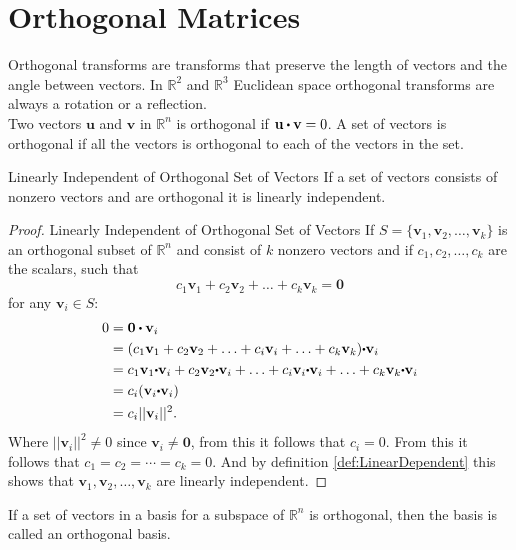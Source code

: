 
\section{Orthogonal Matrices}
Orthogonal transforms are transforms that preserve the length of vectors and the angle between vectors. In $\mathbb{R}^2$ and $\mathbb{R}^3$ Euclidean space orthogonal transforms are always a rotation or a reflection. \\
Two vectors $\textbf{u}$ and $\textbf{v}$ in $\mathbb{R}^n$ is orthogonal if $\textbf{u}\vprik \textbf{v}=0$. A set of vectors is orthogonal if all the vectors is orthogonal to each of the vectors in the set. 
\begin{theorem}{Linearly Independent of Orthogonal Set of Vectors}
If a set of vectors consists of nonzero vectors and are orthogonal it is linearly independent.\cite[375]{LiAl}
\end{theorem}

\begin{proof}{Linearly Independent of Orthogonal Set of Vectors}
If $S=\{\mathbf{v}_1, \mathbf{v}_2, \hdots, \mathbf{v}_k\}$ is an orthogonal subset of $\mathbb{R}^n$ and consist of $k$ nonzero vectors and if $c_1, c_2, \hdots, c_k$ are the scalars, such that
$$c_1\mathbf{v}_1 + c_2\mathbf{v}_2 + \hdots + c_k\mathbf{v}_k = \textbf{0}$$
for any $\mathbf{v}_i\in S$:
\begin{align*}
  0 &= \mathbf{0 \vprik v}_i  \\
  &= (c_1\mathbf{v}_1 + c_2\mathbf{v}_2 + \hdots + c_i \mathbf{v}_i + \hdots + c_k \mathbf{v}_k ) \mathbf{\vprik v}_i \\
  &= c_1\mathbf{v}_1 \mathbf{\vprik v}_i + c_2\mathbf{v}_2 \mathbf{\vprik v}_i + \hdots + c_i \mathbf{v}_i \mathbf{\vprik v}_i + \hdots + c_k\mathbf{v}_k \mathbf{\vprik v}_i \\
  &=c_i(\mathbf{v}_i \mathbf{\vprik v}_i)\\
  &=c_i||\mathbf{v}_i||^2.
\end{align*}
Where $||\mathbf{v}_i||^2 \neq 0$ since $\mathbf{v}_i \neq \mathbf{0}$, from this it follows that $c_i=0$. From this it follows that $c_1=c_2=\cdots=c_k=0$. And by definition \ref{def:LinearDependent} this shows that $\mathbf{v}_1, \mathbf{v}_2, \hdots, \mathbf{v}_k$ are linearly independent. \qedsymbol   
\end{proof}
If a set of vectors in a basis for a subspace of $\mathbb{R}^n$ is orthogonal, then the basis is called an orthogonal basis. 

